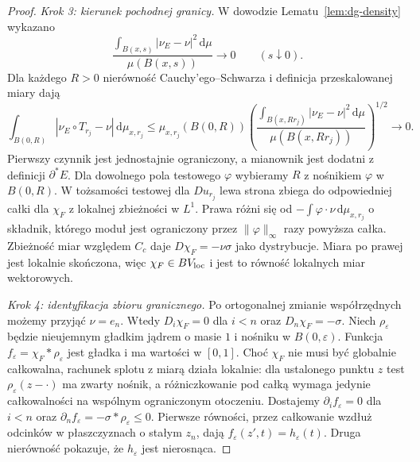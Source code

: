\begin{proof}
\emph{Krok 3: kierunek pochodnej granicy.}
W dowodzie Lematu~\ref{lem:dg-density} wykazano
\[
 \frac{\int_{B(x,s)}|\nu_E-\nu|^2\,\mathrm d\mu}
 {\mu(B(x,s))}\longrightarrow0
 \qquad(s\downarrow0).
\]
Dla każdego $R>0$ nierówność Cauchy'ego--Schwarza
i definicja przeskalowanej miary dają
\[
 \int_{B(0,R)}|\nu_E\circ T_{r_j}-\nu|
 \,\mathrm d\mu_{x,r_j}
 \le \mu_{x,r_j}(B(0,R))
 \left(
 \frac{\int_{B(x,Rr_j)}|\nu_E-\nu|^2\,\mathrm d\mu}
 {\mu(B(x,Rr_j))}
 \right)^{1/2}\longrightarrow0.
\]
Pierwszy czynnik jest jednostajnie ograniczony,
a mianownik jest dodatni z definicji $\partial^*E$.
Dla dowolnego pola testowego $\varphi$ wybieramy
$R$ z nośnikiem $\varphi$ w $B(0,R)$.
W tożsamości testowej dla $Du_{r_j}$ lewa
strona zbiega do odpowiedniej całki dla $\chi_F$
z lokalnej zbieżności w $L^1$.
Prawa różni się od
$-\int\varphi\cdot\nu\,\mathrm d\mu_{x,r_j}$
o składnik, którego moduł jest ograniczony przez
$\|\varphi\|_\infty$ razy powyższa całka.
Zbieżność miar względem $C_c$ daje
$D\chi_F=-\nu\sigma$ jako dystrybucje.
Miara po prawej jest lokalnie skończona, więc
$\chi_F\in BV_{\rm loc}$ i jest to równość
lokalnych miar wektorowych.

\emph{Krok 4: identyfikacja zbioru granicznego.}
Po ortogonalnej zmianie współrzędnych możemy
przyjąć $\nu=e_n$. Wtedy $D_i\chi_F=0$ dla $i<n$
oraz $D_n\chi_F=-\sigma$. Niech $\rho_\varepsilon$
będzie nieujemnym gładkim jądrem o masie $1$
i nośniku w $B(0,\varepsilon)$.
Funkcja $f_\varepsilon=\chi_F*\rho_\varepsilon$
jest gładka i ma wartości w $[0,1]$.
Choć $\chi_F$ nie musi być globalnie całkowalna,
rachunek splotu z miarą działa lokalnie:
dla ustalonego punktu $z$ test
$\rho_\varepsilon(z-\cdot)$ ma zwarty nośnik,
a różniczkowanie pod całką wymaga jedynie
całkowalności na wspólnym ograniczonym otoczeniu.
Dostajemy $\partial_i f_\varepsilon=0$ dla $i<n$
oraz $\partial_n f_\varepsilon=-\sigma*\rho_\varepsilon\le0$.
Pierwsze równości, przez całkowanie wzdłuż
odcinków w płaszczyznach o stałym $z_n$, dają
$f_\varepsilon(z',t)=h_\varepsilon(t)$.
Druga nierówność pokazuje, że $h_\varepsilon$
jest nierosnąca.


\end{proof}
